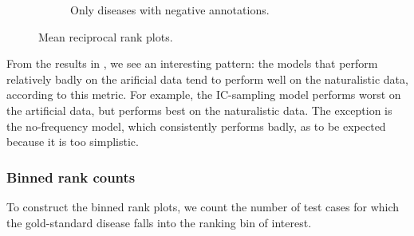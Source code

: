 \begin{figure}[h]
    \begin{subfigure}{0.99\textwidth} \centering
    \caption{Only diseases with negative annotations.}
    \label{fig:mrrneg}
    \end{subfigure}
    \caption{Mean reciprocal rank plots.}
    \label{fig:mrr}
\end{figure}

From the results in , we see an interesting pattern:
the models that perform relatively badly on the arificial data tend to perform well 
on the naturalistic data, according to this metric.
%
For example, the IC-sampling model performs worst on the artificial data, but performs
best on the naturalistic data.
%
The exception is the no-frequency model, which consistently performs badly, 
as to be expected because it is too simplistic.

\subsubsection{Binned rank counts}
\label{subsubsec:metricbrc}
%
To construct the binned rank plots,
we count the number of test cases for which the gold-standard disease falls into the
ranking bin of interest.

